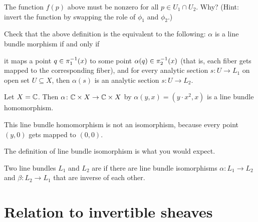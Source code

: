 \begin{exercise}
	The function $f(p)$ above must be nonzero for all $p \in U_1 \cap U_2$. Why? (Hint: invert the
	function by swapping the role of $\phi_1$ and $\phi_2$.)
\end{exercise}

\begin{ques}
	Check that the above definition is the equivalent to the following:
	$\alpha$ is a line bundle morphism if and only if
	\begin{itemize}
		\ii it maps a point $q \in \pi_1^{-1}(x)$ to some point $\alpha(q) \in \pi_2^{-1}(x)$ (that
		is, each fiber gets mapped to the corresponding fiber), and
		\ii for every analytic section $s \colon U \to L_1$ on open set $U \subseteq X$, then
		$\alpha(s)$ is an analytic section $s \colon U \to L_2$.
	\end{itemize}
\end{ques}

\begin{example}
	Let $X = \mathbb C$. Then $\alpha \colon \mathbb C \times X \to \mathbb C \times X$ by $\alpha(y, x) =
	(y \cdot x^2, x)$ is a line bundle homomorphism.

	This line bundle homomorphism is not an isomorphism, because every point $(y, 0)$ gets mapped to
	$(0, 0)$.
\end{example}

The definition of line bundle isomorphism is what you would expect.
\begin{definition}
	Two line bundles $L_1$ and $L_2$ are  if there are line bundle isomorphisms
	$\alpha \colon L_1 \to L_2$ and $\beta \colon L_2 \to L_1$ that are inverse of each other.
\end{definition}

\section{Relation to invertible sheaves}


